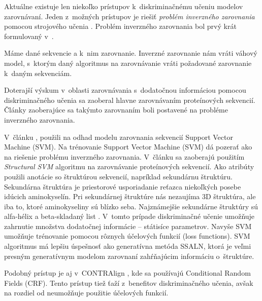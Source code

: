 


Aktuálne existuje len niekoľko prístupov k~diskriminačnému učeniu modelov zarovnávaní.
Jeden z~možných prístupov je riešiť \textit{problém inverzného zarovnania} pomocou strojového učenia \cite{svmTrainingProteinsAlignment}.
Problém inverzného zarovnania bol prvý krát formulovaný v~\cite{inverseAlign1}.
\begin{df}
\label{def:inv-aln}
Máme dané sekvencie a k~nim zarovnanie. Inverzné zarovnanie nám vráti váhový model, s~ktorým daný algoritmus na zarovnávanie vráti požadované zarovnanie k~daným sekvenciám.
\end{df}

Doterajší výskum v~oblasti zarovnávania s~dodatočnou informáciou pomocou diskriminačného učenia sa zaoberal hlavne zarovnávaním proteínových sekvencií. Články zaoberajúce sa takýmto zarovnaním boli postavené na probléme inverzného zarovnania.

V~článku \cite{svmTrainingProteinsAlignment},
použili na odhad modelu zarovnania sekvencií Support Vector Machine (SVM).
Na trénovanie Support Vector Machine (SVM) dá pozerať ako na riešenie problému inverzného zarovnania. V~článku sa zaoberajú použitím \textit{Structural SVM} algoritmu na zarovnávanie proteínových sekvencií. Ako atribúty použili anotácie so štruktúrou sekvencií, napríklad sekundárnu štruktúru.
Sekundárna štruktúra je priestorové usporiadanie reťazca niekoľkých posebe idúcich aminokyselín. Pri sekundárnej štruktúre nás nezaujíma 3D štruktúra, ale iba to, ktoré aminokyseliny sú blízko seba. Najznámejšie sekundárne štruktúry sú alfa-hélix a beta-skladaný list \cite{wiki:bielkovina}.
V~tomto prípade diskriminačné učenie umožňuje zahrnutie množstva dodatočnej informácie -- státisíce parametrov.
Navyše SVM umožňuje trénovanie pomocou rôznych účelových funkcií (loss functions).
SVM algoritmus má lepšiu úspešnosť ako generatívna metóda SSALN, ktorá je veľmi presným generatívnym modelom zarovnaní zahŕňajúcim informáciu o~štruktúre.

Podobný prístup je aj v~CONTRAlign \cite{contralign}, kde sa používajú Conditional Random Fields (CRF). Tento prístup tiež ťaží z~benefitov diskriminačného učenia, avšak na rozdiel od \cite{svmTrainingProteinsAlignment} neumožňuje použitie účelových funkcií.
